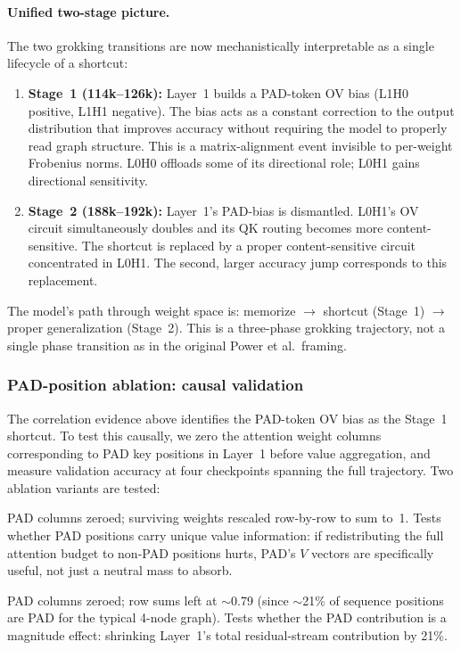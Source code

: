 \documentclass[11pt, a4paper]{article}
\begin{document}
\paragraph{Unified two-stage picture.}
The two grokking transitions are now mechanistically interpretable as a single
lifecycle of a shortcut:
\begin{enumerate}
  \item \textbf{Stage~1 (114k--126k):} Layer~1 builds a PAD-token OV bias
    (L1H0 positive, L1H1 negative).  The bias acts as a constant correction to
    the output distribution that improves accuracy without requiring the model to
    properly read graph structure.  This is a matrix-alignment event invisible to
    per-weight Frobenius norms.  L0H0 offloads some of its directional role;
    L0H1 gains directional sensitivity.
  \item \textbf{Stage~2 (188k--192k):} Layer~1's PAD-bias is dismantled.
    L0H1's OV circuit simultaneously doubles and its QK routing becomes more
    content-sensitive.  The shortcut is replaced by a proper content-sensitive
    circuit concentrated in L0H1.  The second, larger accuracy jump corresponds
    to this replacement.
\end{enumerate}
The model's path through weight space is: memorize $\to$ shortcut
(Stage~1) $\to$ proper generalization (Stage~2).  This is a three-phase grokking
trajectory, not a single phase transition as in the original Power et al.\
framing.

\subsubsection{PAD-position ablation: causal validation}
\label{sec:pad-ablation}

The correlation evidence above identifies the PAD-token OV bias as the Stage~1
shortcut. To test this causally, we zero the attention weight columns
corresponding to PAD key positions in Layer~1 before value aggregation, and
measure validation accuracy at four checkpoints spanning the full trajectory.
Two ablation variants are tested:

\begin{description}[noitemsep]
  \item[Renormalized.] PAD columns zeroed; surviving weights rescaled row-by-row
    to sum to~1. Tests whether PAD positions carry unique value information: if
    redistributing the full attention budget to non-PAD positions hurts, PAD's
    $V$ vectors are specifically useful, not just a neutral mass to absorb.
  \item[No-renorm.] PAD columns zeroed; row sums left at $\sim$0.79 (since
    $\sim$21\% of sequence positions are PAD for the typical 4-node graph). Tests
    whether the PAD contribution is a magnitude effect: shrinking Layer~1's
    total residual-stream contribution by 21\%.
\end{description}
\end{document}
